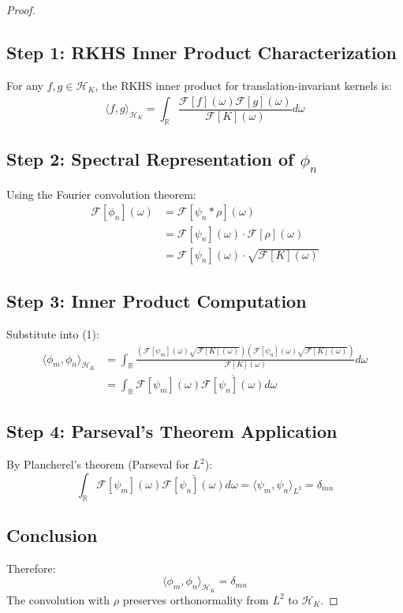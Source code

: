 \documentclass{article}
\begin{document}
\begin{proof}

\subsection*{Step 1: RKHS Inner Product Characterization}
For any $f,g \in \mathscr{H}_K$, the RKHS inner product for translation-invariant kernels is:
\begin{equation}
\langle f,g \rangle_{\mathscr{H}_K} = \int_{\mathbb{R}} \frac{\mathcal{F}[f](\omega)\overline{\mathcal{F}[g](\omega)}}{\mathcal{F}[K](\omega)} d\omega
\end{equation}

\subsection*{Step 2: Spectral Representation of $\phi_n$}
Using the Fourier convolution theorem:
\begin{align}
\mathcal{F}[\phi_n](\omega) &= \mathcal{F}[\psi_n * \rho](\omega) \\
&= \mathcal{F}[\psi_n](\omega) \cdot \mathcal{F}[\rho](\omega) \\
&= \mathcal{F}[\psi_n](\omega) \cdot \sqrt{\mathcal{F}[K](\omega)}
\end{align}

\subsection*{Step 3: Inner Product Computation}
Substitute into (1):
\begin{align}
\langle \phi_m, \phi_n \rangle_{\mathscr{H}_K} &= \int_{\mathbb{R}} \frac{\left(\mathcal{F}[\psi_m](\omega)\sqrt{\mathcal{F}[K](\omega)}\right)\left(\overline{\mathcal{F}[\psi_n](\omega)}\sqrt{\mathcal{F}[K](\omega)}\right)}{\mathcal{F}[K](\omega)} d\omega \\
&= \int_{\mathbb{R}} \mathcal{F}[\psi_m](\omega)\overline{\mathcal{F}[\psi_n](\omega)} d\omega
\end{align}

\subsection*{Step 4: Parseval's Theorem Application}
By Plancherel's theorem (Parseval for $L^2$):
\begin{equation}
\int_{\mathbb{R}} \mathcal{F}[\psi_m](\omega)\overline{\mathcal{F}[\psi_n](\omega)} d\omega = \langle \psi_m, \psi_n \rangle_{L^2} = \delta_{mn}
\end{equation}

\subsection*{Conclusion}
Therefore:
\[
\langle \phi_m, \phi_n \rangle_{\mathscr{H}_K} = \delta_{mn}
\]
The convolution with $\rho$ preserves orthonormality from $L^2$ to $\mathscr{H}_K$.\qedhere
\end{proof}
\end{document}
